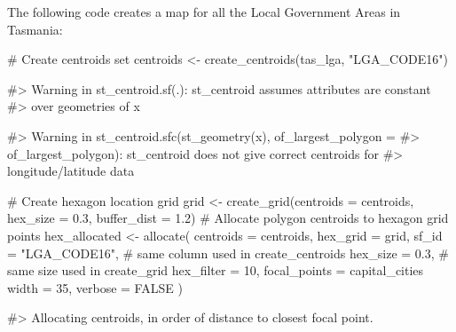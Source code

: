 The following code creates a map for all the Local Government Areas in
Tasmania:

\begin{Schunk}
\begin{Sinput}
# Create centroids set
centroids <- create_centroids(tas_lga, "LGA_CODE16")
\end{Sinput}
\begin{Soutput}
#> Warning in st_centroid.sf(.): st_centroid assumes attributes are constant
#> over geometries of x
\end{Soutput}
\begin{Soutput}
#> Warning in st_centroid.sfc(st_geometry(x), of_largest_polygon =
#> of_largest_polygon): st_centroid does not give correct centroids for
#> longitude/latitude data
\end{Soutput}
\begin{Sinput}
# Create hexagon location grid
grid <- create_grid(centroids = centroids,
    hex_size = 0.3,
    buffer_dist = 1.2)
# Allocate polygon centroids to hexagon grid points
hex_allocated <- allocate(
  centroids = centroids,
  hex_grid = grid,
  sf_id = "LGA_CODE16",
  # same column used in create_centroids
  hex_size = 0.3,
  # same size used in create_grid
  hex_filter = 10,
  focal_points = capital_cities %
  width = 35,
  verbose = FALSE
)
\end{Sinput}
\begin{Soutput}
#> Allocating centroids, in order of distance to closest focal point.
\end{Soutput}
\end{Schunk}

